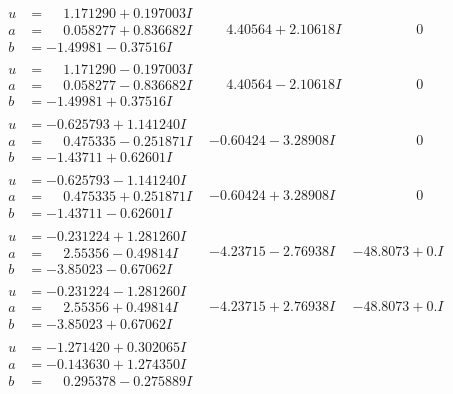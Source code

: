 \documentclass[1p]{elsarticle_modified}
\theoremstyle{definition}
\begin{document}
$$\begin{array}{c|c|c}
\begin{aligned}
u &= \phantom{-}1.171290 + 0.197003 I \\
a &= \phantom{-}0.058277 + 0.836682 I \\
b &= -1.49981 - 0.37516 I\end{aligned}
 & \phantom{-}4.40564 + 2.10618 I & \phantom{-0.000000 } 0 \\ \hline\begin{aligned}
u &= \phantom{-}1.171290 - 0.197003 I \\
a &= \phantom{-}0.058277 - 0.836682 I \\
b &= -1.49981 + 0.37516 I\end{aligned}
 & \phantom{-}4.40564 - 2.10618 I & \phantom{-0.000000 } 0 \\ \hline\begin{aligned}
u &= -0.625793 + 1.141240 I \\
a &= \phantom{-}0.475335 - 0.251871 I \\
b &= -1.43711 + 0.62601 I\end{aligned}
 & -0.60424 - 3.28908 I & \phantom{-0.000000 } 0 \\ \hline\begin{aligned}
u &= -0.625793 - 1.141240 I \\
a &= \phantom{-}0.475335 + 0.251871 I \\
b &= -1.43711 - 0.62601 I\end{aligned}
 & -0.60424 + 3.28908 I & \phantom{-0.000000 } 0 \\ \hline\begin{aligned}
u &= -0.231224 + 1.281260 I \\
a &= \phantom{-}2.55356 - 0.49814 I \\
b &= -3.85023 - 0.67062 I\end{aligned}
 & -4.23715 - 2.76938 I & -48.8073 + 0. I\phantom{ +0.000000I} \\ \hline\begin{aligned}
u &= -0.231224 - 1.281260 I \\
a &= \phantom{-}2.55356 + 0.49814 I \\
b &= -3.85023 + 0.67062 I\end{aligned}
 & -4.23715 + 2.76938 I & -48.8073 + 0. I\phantom{ +0.000000I} \\ \hline\begin{aligned}
u &= -1.271420 + 0.302065 I \\
a &= -0.143630 + 1.274350 I \\
b &= \phantom{-}0.295378 - 0.275889 I\end{aligned}

\end{array}$$
\end{document}
